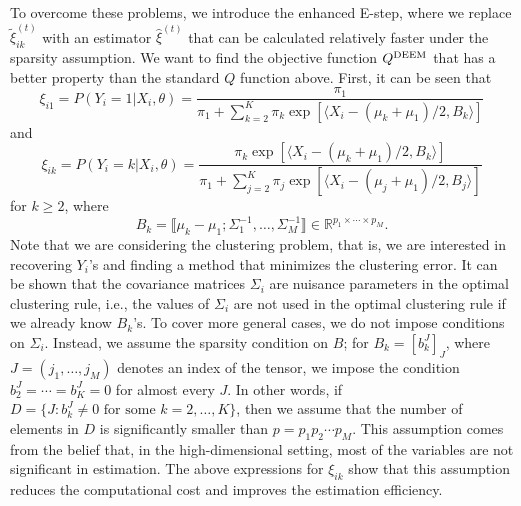 \documentclass[11pt]{article}
\newcommand{\rp}{\mathbb{R}^{p_1\times \cdots \times p_M}}
\newcommand{\br}[1]{\llbracket #1 \rrbracket}
\newcommand{\wh}{\widehat}
\newcommand{\wt}{\widetilde}
\begin{document}
To overcome these problems, we introduce the enhanced E-step, where we replace $\wt\xi^{(t)}_{ik}$ with an estimator $\wh\xi^{(t)}$ that can be calculated relatively faster under the sparsity assumption. 
We want to find the objective function $Q^{\textup{DEEM}}$ that has a better property than the standard $Q$ function above. First, it can be seen that
\begin{equation}\label{xi1}
  \xi_{i1}=P(Y_i=1|X_i, \theta) = \frac{\pi_1}{\pi_1 + \sum_{k=2}^K \pi_k \exp\left[ \langle X_i - (\mu_k+\mu_1)/2 , B_k \rangle \right]}
\end{equation}
and
\begin{equation}\label{xi2}
  \xi_{ik}=P(Y_i=k|X_i, \theta) = \frac{\pi_k \exp \left[ \langle X_i - (\mu_k+\mu_1)/2 , B_k \rangle \right]}{\pi_1 + \sum_{j=2}^K \pi_j \exp\left[ \langle X_i - (\mu_j+\mu_1)/2 , B_j \rangle \right]}
\end{equation}
for $k\ge2$, where
\begin{equation*}
  B_k = \br{\mu_k - \mu_1 ; \Sigma_1^{-1} , \dots , \Sigma_M^{-1}}\in  \rp.
\end{equation*}
Note that we are considering the clustering problem, that is, we are interested in recovering $Y_i$'s and finding a method that minimizes the clustering error.
It can be shown that the covariance matrices $\Sigma_i$ are nuisance parameters in the optimal clustering rule, i.e., 
the values of $\Sigma_i$ are not used in the optimal clustering rule if we already know $B_k$'s.
To cover more general cases, we do not impose conditions on $\Sigma_i$.
Instead, we assume the sparsity condition on $B$; for $B_k=[b^J_k]_{J}$, where $J=(j_1,\dots, j_M)$ denotes an index of the tensor, we impose the condition $b_2^J=\cdots = b_K^J=0 $ for almost every $J$. In other words, if 
$D= \{J : b_k^J \neq 0 \text{ for some $k=2,\dots, K$} \}$, then we assume that the number of elements in $D$ is significantly smaller than $p=p_1p_2 \cdots p_M$. This assumption comes from the belief that, in the high-dimensional setting, most of the variables are not significant in estimation.
The above expressions for $\xi_{ik}$ show that this assumption reduces the computational cost and improves the estimation efficiency.
\end{document}

